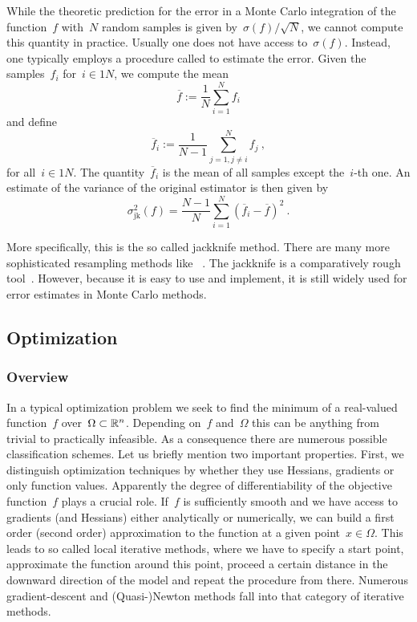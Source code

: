 While the theoretic prediction for the error in a Monte Carlo integration of the
function~$f$ with~$N$ random samples is given by~$\sigma(f) / \sqrt{N}$, we
cannot compute this quantity in practice. Usually one does not have access
to~$\sigma(f)$. Instead, one typically employs a procedure called
 to estimate the error. Given the samples~$f_i$ for~$i \in
\numlist{1}{N}$, we compute the mean
%
\begin{equation}
  \overline{f} := \frac{1}{N} \sum_{i=1}^N f_i
\end{equation}
%
and define
%
\begin{equation}
  \overline{f}_i := \frac{1}{N-1} \sum_{j=1, j\ne i}^N f_j \:,
\end{equation}
%
for all~$i \in \numlist{1}{N}$. The quantity~$\overline{f}_i$ is the mean of all
samples except the~$i$-th one. An estimate of the variance of the original
estimator is then given by
%
\begin{equation}
  \sigma_{\mathrm{jk}}^2(f) =
    \frac{N-1}{N} \sum_{i=1}^N (\overline{f}_i - \overline{f})^2\:.
\end{equation}

More specifically, this is the so called  jackknife
method. There are many more sophisticated resampling methods like
~\cite{bootstrap}. The jackknife is a comparatively rough
tool~\cite{jackknife}. However, because it is easy to use and implement, it is
still widely used for error estimates in Monte Carlo methods.

\subsection{Optimization}

\subsubsection{Overview}

In a typical optimization problem we seek to find the minimum of a real-valued
function~$f$ over~$\Omega \subset \mathbb{R}^n$. Depending on~$f$ and~$\Omega$ this can
be anything from trivial to practically infeasible. As a consequence there are
numerous possible classification schemes. Let us briefly mention two important
properties. First, we distinguish optimization techniques by whether they use
Hessians, gradients or only function values. Apparently the degree of
differentiability of the objective function~$f$ plays a crucial role. If~$f$ is
sufficiently smooth and we have access to gradients (and Hessians) either
analytically or numerically, we can build a first order (second order)
approximation to the function at a given point~$x \in \Omega$. This leads to so
called local iterative methods, where we have to specify a start point,
approximate the function around this point, proceed a certain distance in the
downward direction of the model and repeat the procedure from there. Numerous
gradient-descent and (Quasi-)Newton methods fall into that category of iterative
methods.

